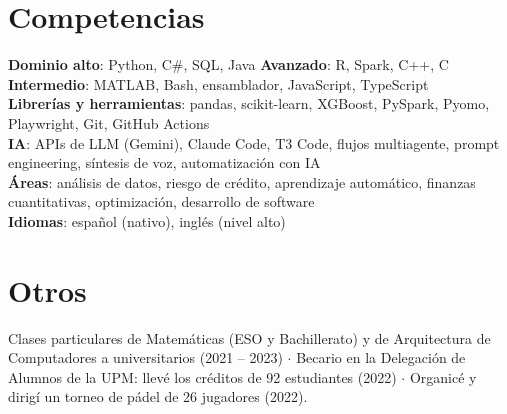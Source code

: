 \section{Competencias}
 \begin{itemize}[leftmargin=0.15in, label={}]
    \small{\item{
     \textbf{Dominio alto}{: Python, C\#, SQL, Java} \quad \textbf{Avanzado}{: R, Spark, C++, C} \quad \textbf{Intermedio}{: MATLAB, Bash, ensamblador, JavaScript, TypeScript} \\
     \textbf{Librerías y herramientas}{: pandas, scikit-learn, XGBoost, PySpark, Pyomo, Playwright, Git, GitHub Actions} \\
     \textbf{IA}{: APIs de LLM (Gemini), Claude Code, T3 Code, flujos multiagente, prompt engineering, síntesis de voz, automatización con IA} \\
     \textbf{Áreas}{: análisis de datos, riesgo de crédito, aprendizaje automático, finanzas cuantitativas, optimización, desarrollo de software} \\
     \textbf{Idiomas}{: español (nativo), inglés (nivel alto)}
    }}
 \end{itemize}

\section{Otros}
 \begin{itemize}[leftmargin=0.15in, label={}]
    \small{\item{
     Clases particulares de Matemáticas (ESO y Bachillerato) y de Arquitectura de Computadores a universitarios (2021 -- 2023) $\cdot$
     Becario en la Delegación de Alumnos de la UPM: llevé los créditos de 92 estudiantes (2022) $\cdot$
     Organicé y dirigí un torneo de pádel de 26 jugadores (2022).
    }}
 \end{itemize}


